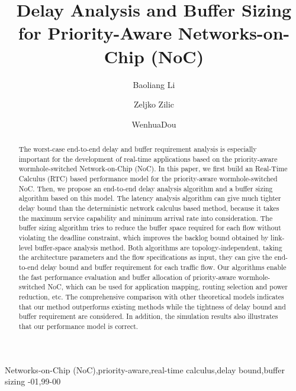 \documentclass[preprint]{elsarticle}
\begin{document}
\begin{frontmatter}

\title{Delay Analysis and Buffer Sizing for Priority-Aware Networks-on-Chip (NoC)}

\author[nudt]{Baoliang Li}
\author[mcgill]{Zeljko Zilic}
\author[nudt]{WenhuaDou}
\address[nudt]{College of Computer Science, National University of Defense Technology, Changsha 410073, P.R. China}
\address[mcgill]{Department of Electrical \& Computer Engineering, McGill University, Montreal H3A-2A7, Quebec, Canada}

\begin{abstract}
The worst-case end-to-end delay and buffer requirement analysis is especially important for the development of real-time applications based on the priority-aware wormhole-switched Network-on-Chip (NoC). In this paper, we first build an Real-Time Calculus (RTC) based performance model for the priority-aware wormhole-switched NoC. Then, we propose an end-to-end delay analysis algorithm and a buffer sizing algorithm based on this model. The latency analysis algorithm can give much tighter delay bound than the deterministic network calculus based method, because it takes the maximum service capability and minimum arrival rate into consideration. The buffer sizing algorithm tries to reduce the buffer space required for each flow without violating the deadline constraint, which improves the backlog bound obtained by link-level buffer-space analysis method. Both algorithms are topology-independent, taking the architecture parameters and the flow specifications as input, they can give the end-to-end delay bound and buffer requirement for each traffic flow. Our algorithms enable the fast performance evaluation and buffer allocation of priority-aware wormhole-switched NoC, which can be used for application mapping, routing selection and power reduction, etc. The comprehensive comparison with other theoretical models indicates that our method outperforms existing methods while the tightness of delay bound and buffer requirement are considered. In addition, the simulation results also illustrates that our performance model is correct.
\end{abstract}

\begin{keyword}
Networks-on-Chip (NoC)\sep priority-aware\sep real-time calculus\sep delay bound\sep buffer sizing
-01\sep  99-00
\end{keyword}

\end{frontmatter}
\end{document}
